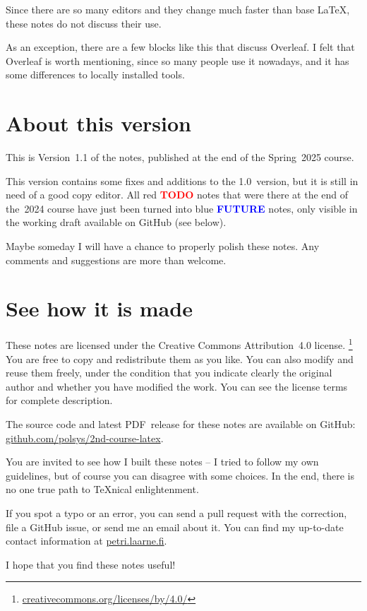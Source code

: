 Since there are so many editors and they change much faster than base \LaTeX,
these notes do not discuss their use.

\begin{overleaf}
As an exception, there are a few blocks like this that discuss Overleaf.
I felt that Overleaf is worth mentioning, since so many people use it nowadays,
and it has some differences to locally installed tools.
\end{overleaf}


%
%
\section{About this version}

This is Version~1.1 of the notes, published at the end of the Spring~2025 course.

This version contains some fixes and additions to the 1.0~version,
but it is still in need of a good copy editor.
All red \textcolor{red}{\textbf{TODO}} notes that were there at the end of the~2024 course
have just been turned into blue \textcolor{blue}{\textbf{FUTURE}} notes,
only visible in the working draft available on GitHub (see below).


Maybe someday I will have a chance to properly polish these notes.
Any comments and suggestions are more than welcome.



%
%
\section{See how it is made}

\noindent{\Huge\faCreativeCommons\faCreativeCommonsBy}
These notes are licensed under the Creative Commons Attribution~4.0 license.%
\footnote{\url{creativecommons.org/licenses/by/4.0/}}
You are free to copy and redistribute them as you like.
You can also modify and reuse them freely,
under the condition that you indicate clearly the original author
and whether you have modified the work.
You can see the license terms for complete description.

\bigskip\noindent{\huge\faGithub}
The source code and latest PDF~release for these notes are available on GitHub:
\url{github.com/polsys/2nd-course-latex}.

You are invited to see how I built these notes
-- I tried to follow my own guidelines, but of course you can disagree with some choices.
In the end, there is no one true path to \TeX nical enlightenment.

If you spot a typo or an error, you can send a pull request with the correction,
file a GitHub issue, or send me an email about it.
You can find my up-to-date contact information at \url{petri.laarne.fi}.

\bigskip\noindent
I hope that you find these notes useful!
